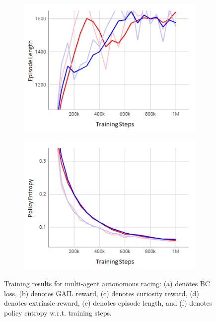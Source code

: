 \documentclass[letterpaper, 10 pt, conference]{ieeeconf}  %
\begin{document}
\begin{figure}[t]
\begin{subfigure}[b]{0.16\linewidth}
         \includegraphics[width=\linewidth]{Fig9e.png}
         \caption{}
         \label{fig9e}
     \end{subfigure}
     \hfill
     \begin{subfigure}[b]{0.16\linewidth}
         \centering
         \includegraphics[width=\linewidth]{Fig9f.png}
         \caption{}
         \label{fig9f}
     \end{subfigure}
     \caption{Training results for multi-agent autonomous racing: (a) denotes BC loss, (b) denotes GAIL reward, (c) denotes curiosity reward, (d) denotes extrinsic reward, (e) denotes episode length, and (f) denotes policy entropy w.r.t. training steps.}
    \label{fig9}
\end{figure}
\end{document}
